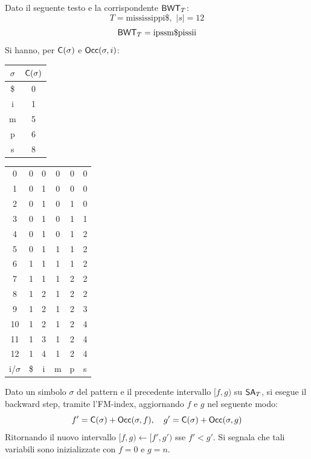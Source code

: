 \begin{esempio}
  Dato il seguente testo e la corrispondente $\mbox{\rm {\sf BWT}}_T$:
  \[T=\mbox{mississippi\$},\,\,|s|=12\]
  \[\mbox{\rm {\sf BWT}}_T=\mbox{ipssm\$pissii}\]
  \newpage
  Si hanno, per $\mbox{\rm {\sf C}}(\sigma)$ e $\mbox{\rm {\sf Occ}}(\sigma, i)$:
  \begin{table}[H]
    \centering
    \begin{tabular}{c||c}
      $\sigma$ & $\mbox{\rm {\sf C}}(\sigma)$\\
      \hline
      \hline
      \$ & 0\\
      i & 1 \\
      m & 5\\
      p & 6\\
      s & 8\\
    \end{tabular}\quad\quad\quad\quad\quad
    \begin{tabular}{c||c|c|c|c|c}
      0 & 0 & 0 & 0 & 0 & 0 \\
      1 & 0 & 1 & 0 & 0 & 0 \\
      2 & 0 & 1 & 0 & 1 & 0 \\
      3 & 0 & 1 & 0 & 1 & 1 \\
      4 & 0 & 1 & 0 & 1 & 2 \\
      5 & 0 & 1 & 1 & 1 & 2 \\
      6 & 1 & 1 & 1 & 1 & 2 \\
      7 & 1 & 1 & 1 & 2 & 2 \\
      8 & 1 & 2 & 1 & 2 & 2 \\
      9 & 1 & 2 & 1 & 2 & 3 \\
      10 & 1 & 2 & 1 & 2 & 4 \\
      11 & 1 & 3 & 1 & 2 & 4 \\
      12 & 1 & 4 & 1 & 2 & 4 \\
      \hline
      \hline
      i/$\sigma$ & \$ & i & m & p & s
    \end{tabular}
  \end{table}
\end{esempio}
Dato un simbolo $\sigma$ del pattern e il precedente intervallo $[f,g)$ su
$\mbox{\rm {\sf SA}}_T$, si esegue il backward step, tramite l'FM-index,
aggiornando $f$ e $g$ nel seguente modo: 
\begin{equation}
  \label{eq:bwt6}
  f'=\mbox{\rm {\sf C}}(\sigma)+\mbox{\rm {\sf Occ}}(\sigma, f),\quad g'=\mbox{\rm {\sf C}}(\sigma)+\mbox{\rm {\sf Occ}}(\sigma, g)
\end{equation}
Ritornando il nuovo intervallo $[f, g)\gets [f', g')$ sse $f'< g'$.
Si segnala che tali variabili sono inizializzate con $f=0$ e $g=n$.\\
